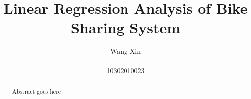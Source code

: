 \documentclass[twocolumn]{article}
\begin{document}
\title{Linear Regression Analysis of Bike Sharing System }

\author{Wang Xin\\ \vspace{0.5cm}\\
 10302010023}

\date{}
\maketitle
\begin{abstract}
Abstract goes here
\end{abstract}









\appendix

\end{document}
